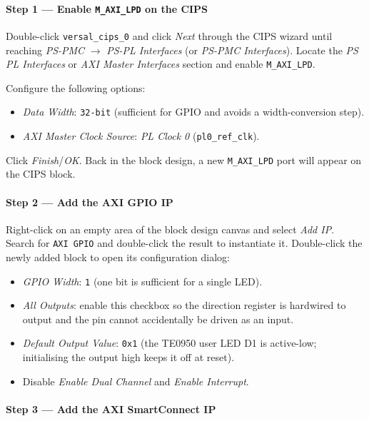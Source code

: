 \documentclass[
	a4paper,
]{CSMakotoTechnicalReport}
\begin{document}
\paragraph*{Step 1 --- Enable \texttt{M\_AXI\_LPD} on the CIPS}

Double-click \texttt{versal\_cips\_0} and click \textit{Next} through the CIPS wizard until reaching \textit{PS-PMC} $\to$ \textit{PS-PL Interfaces} (or \textit{PS-PMC Interfaces}).
Locate the \textit{PS PL Interfaces} or \textit{AXI Master Interfaces} section and enable \texttt{M\_AXI\_LPD}.

Configure the following options:

\begin{itemize}
    \item \textit{Data Width}: \texttt{32-bit} (sufficient for GPIO and avoids a width-conversion step).
    \item \textit{AXI Master Clock Source}: \textit{PL Clock 0} (\texttt{pl0\_ref\_clk}).
\end{itemize}

Click \textit{Finish}/\textit{OK}.
Back in the block design, a new \texttt{M\_AXI\_LPD} port will appear on the CIPS block.

\paragraph*{Step 2 --- Add the AXI GPIO IP}

Right-click on an empty area of the block design canvas and select \textit{Add IP}.
Search for \texttt{AXI GPIO} and double-click the result to instantiate it.
Double-click the newly added block to open its configuration dialog:

\begin{itemize}
    \item \textit{GPIO Width}: \texttt{1} (one bit is sufficient for a single LED).
    \item \textit{All Outputs}: enable this checkbox so the direction register is hardwired to output and the pin cannot accidentally be driven as an input.
    \item \textit{Default Output Value}: \texttt{0x1} (the TE0950 user LED D1 is active-low; initialising the output high keeps it off at reset).
    \item Disable \textit{Enable Dual Channel} and \textit{Enable Interrupt}.
\end{itemize}

\paragraph*{Step 3 --- Add the AXI SmartConnect IP}
\end{document}
